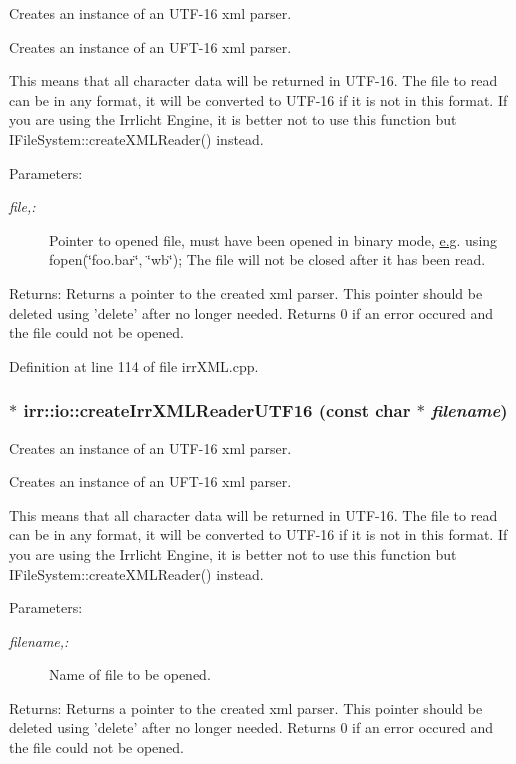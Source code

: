 Creates an instance of an UTF-16 xml parser. 

Creates an instance of an UFT-16 xml parser.

This means that all character data will be returned in UTF-16. The file to read can be in any format, it will be converted to UTF-16 if it is not in this format. If you are using the Irrlicht Engine, it is better not to use this function but IFileSystem::createXMLReader() instead. \begin{Desc}
\item[Parameters:]
\begin{description}
\item[{\em file,:}]Pointer to opened file, must have been opened in binary mode, \hyperlink{glext__bak_8h_caceb3a655ff28b75259860bcb868f9f}{e.g}. using fopen(\char`\"{}foo.bar\char`\"{}, \char`\"{}wb\char`\"{}); The file will not be closed after it has been read. \end{description}
\end{Desc}
\begin{Desc}
\item[Returns:]Returns a pointer to the created xml parser. This pointer should be deleted using 'delete' after no longer needed. Returns 0 if an error occured and the file could not be opened. \end{Desc}


Definition at line 114 of file irrXML.cpp.\hypertarget{namespaceirr_1_1io_41c9d4c0d94702b3da2dca5799384443}{
\subsubsection[{createIrrXMLReaderUTF16}]{ $\ast$ irr::io::createIrrXMLReaderUTF16 (const char $\ast$ {\em filename})}}
\label{namespaceirr_1_1io_41c9d4c0d94702b3da2dca5799384443}


Creates an instance of an UTF-16 xml parser. 

Creates an instance of an UFT-16 xml parser.

This means that all character data will be returned in UTF-16. The file to read can be in any format, it will be converted to UTF-16 if it is not in this format. If you are using the Irrlicht Engine, it is better not to use this function but IFileSystem::createXMLReader() instead. \begin{Desc}
\item[Parameters:]
\begin{description}
\item[{\em filename,:}]Name of file to be opened. \end{description}
\end{Desc}
\begin{Desc}
\item[Returns:]Returns a pointer to the created xml parser. This pointer should be deleted using 'delete' after no longer needed. Returns 0 if an error occured and the file could not be opened. \end{Desc}


